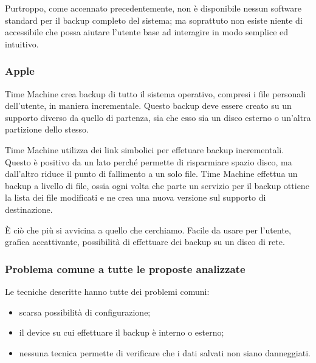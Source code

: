 \documentclass{beamer}
\begin{document}
\begin{frame}
Purtroppo, come accennato precedentemente, non \`e disponibile nessun software standard per il backup completo del sistema; ma soprattuto non esiste niente di accessibile che possa aiutare l'utente base ad interagire in modo semplice ed intuitivo.
\end{frame}

\begin{frame}
\frametitle{Apple}
Time Machine crea backup di tutto il sistema operativo, compresi i file personali dell'utente, in maniera incrementale.
\newline
Questo backup deve essere creato su un supporto diverso da quello di partenza, sia che esso sia un disco esterno o un'altra partizione dello stesso.
\end{frame}

\begin{frame}
Time Machine utilizza dei link simbolici per effetuare backup incrementali. 
\newline
Questo \`e positivo da un lato perch\'e permette di risparmiare spazio disco, ma dall'altro riduce il punto di fallimento a un solo file.
\newline
Time Machine effettua un backup a livello di file, ossia ogni volta che parte un servizio per il backup ottiene la lista dei file modificati e ne crea una nuova versione sul supporto di destinazione.
\end{frame}

\begin{frame}
\`E ci\`o che pi\`u si avvicina a quello che cerchiamo.
\newline
Facile da usare per l'utente, grafica accattivante, possibilit\`a di effettuare dei backup su un disco di rete.
\end{frame}

\begin{frame}
\frametitle{Problema comune a tutte le proposte analizzate}
Le tecniche descritte hanno tutte dei problemi comuni:
\begin{itemize}
\item scarsa possibilit\`a di configurazione;
\item il device su cui effettuare il backup \`e interno o esterno;%
\item nessuna tecnica permette di verificare che i dati salvati non siano danneggiati.
\end{itemize}
\end{frame}
\end{document}
